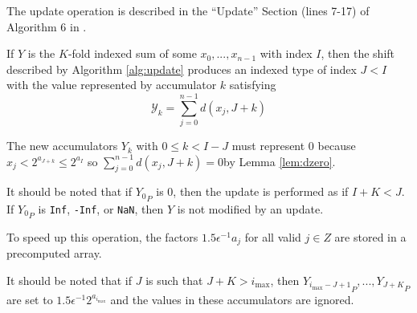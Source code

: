     The update operation is described in the ``Update'' Section (lines 7-17) of Algorithm $6$ in \cite{repsum}.

    If $Y$ is the $K$-fold indexed sum of some $x_0, ..., x_{n - 1}$ with index
    $I$, then the shift described by Algorithm \ref{alg:update} produces an
    indexed type of index $J < I$ with the value represented by accumulator $k$
    satisfying
    \begin{equation*}
      \mathcal{Y}_k = \sum\limits_{j = 0}^{n - 1} d(x_j, J + k)
    \end{equation*}

    The new accumulators $Y_k$ with $0 \leq k < I - J$ must represent 0 because
    $x_j < 2^{a_{J + k}} \leq 2^{a_I}$ so
    \(
    	\sum\limits_{j = 0}^{n - 1} d(x_j, J + k) = 0
    \)by Lemma \ref{lem:dzero}.

    It should be noted that if ${Y_0}_P$ is 0, then the update is performed as
    if $I + K < J$. If ${Y_0}_P$ is \texttt{Inf}, \texttt{-Inf}, or
    \texttt{NaN}, then $Y$ is not modified by an update.

    To speed up this operation, the factors $1.5  \epsilon^{-1}  a_j$ for all
    valid $j \in Z$ are stored in a precomputed array.

    It should be noted that if $J$ is such that $J + K > i_{\max}$, then
    ${Y_{i_{\max} - J + 1}}_P, ...,  {Y_{J + K}}_P$ are set to $1.5
    \epsilon^{-1}2^{a_{i_{\max}}}$ and the values in these accumulators are
    ignored.

